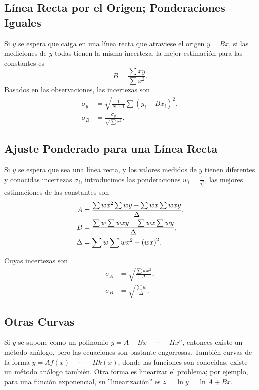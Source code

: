 \subsection{Línea Recta por el Origen; Ponderaciones Iguales}
Si $y$ se espera que caiga en una línea recta que atraviese el origen $y = Bx$, si las mediciones de $y$ todas tienen la misma incerteza, la mejor estimación para las constantes es
	\begin{equation}
		B = \frac{\sum xy}{\sum x^2}.
	\end{equation}
Basados en las observaciones, las incertezas son
	\begin{align}
		\sigma _y &= \sqrt{\frac{1}{N - 1} \sum (y_i - Bx_i)^2}, \\
		\sigma _B &= \frac{\sigma _y}{\sqrt{\sum x^2}}.
	\end{align}

\subsection{Ajuste Ponderado para una Línea Recta}
Si $y$ se espera que sea una línea recta, y los valores medidos de $y$ tienen diferentes y conocidas incertezas $\sigma _i$, introducimos las ponderaciones $w_i = \frac{1}{\sigma _i ^2}$, las mejores estimaciones de las constantes son
	\begin{align}
		A &= \frac{\sum wx^2 \sum wy - \sum wx \sum wxy}{\Delta}, \\
		B &= \frac{\sum w \sum wxy - \sum wx \sum wy}{\Delta}, \\
		\Delta &= \sum w \sum wx^2 - \qty(wx)^2.
	\end{align}

Cuyas incertezas son
	\begin{align}
		\sigma _A &= \sqrt{\frac{\sum wx^2}{\Delta}}, \\
		\sigma _B &= \sqrt{\frac{\sum w}{\Delta}}.
	\end{align}

\subsection{Otras Curvas}
Si $y$ se supone como un polinomio $y = A + Bx + \cdots + Hx^n$, entonces existe un método análogo, pero las ecuaciones son bastante engorrosas. También curvas de la forma $y = A f(x) + \cdots + Hk(x)$, donde las funciones son conocidas, existe un método análogo también. Otra forma es linearizar el problema; por ejemplo, para una función exponencial, su ''linearización'' es $z = \ln{y} = \ln{A} + Bx$.




